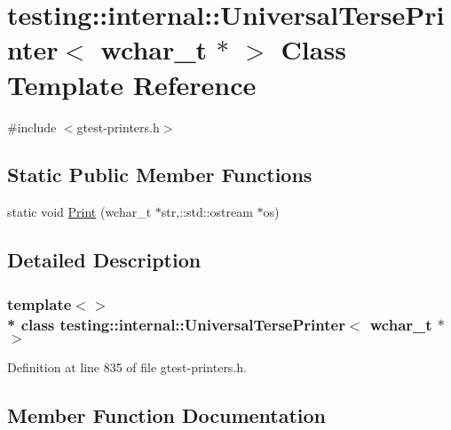 \hypertarget{classtesting_1_1internal_1_1_universal_terse_printer_3_01wchar__t_01_5_01_4}{}\section{testing\+:\+:internal\+:\+:Universal\+Terse\+Printer$<$ wchar\+\_\+t $\ast$ $>$ Class Template Reference}
\label{classtesting_1_1internal_1_1_universal_terse_printer_3_01wchar__t_01_5_01_4}


{\ttfamily \#include $<$gtest-\/printers.\+h$>$}

\subsection*{Static Public Member Functions}
\begin{DoxyCompactItemize}
\item 
static void \hyperlink{classtesting_1_1internal_1_1_universal_terse_printer_3_01wchar__t_01_5_01_4_af6009c8891ea3bdc190eddf76228305a}{Print} (wchar\+\_\+t $\ast$str,\+::std\+::ostream $\ast$os)
\end{DoxyCompactItemize}


\subsection{Detailed Description}
\subsubsection*{template$<$$>$\\*
class testing\+::internal\+::\+Universal\+Terse\+Printer$<$ wchar\+\_\+t $\ast$ $>$}



Definition at line 835 of file gtest-\/printers.\+h.



\subsection{Member Function Documentation}
